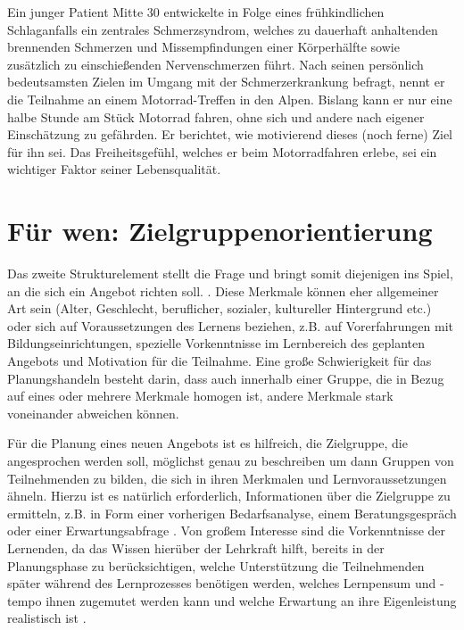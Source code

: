 \documentclass[
  twoside,
  parskip=half-,
]{scrreprt}
\begin{document}
\begin{beispiel}
  Ein junger Patient Mitte 30 entwickelte in Folge eines frühkindlichen Schlaganfalls ein zentrales Schmerzsyndrom, welches zu dauerhaft anhaltenden brennenden Schmerzen und Missempfindungen einer Körperhälfte sowie zusätzlich zu einschießenden Nervenschmerzen führt. Nach seinen persönlich bedeutsamsten Zielen im Umgang mit der Schmerzerkrankung befragt, nennt er die Teilnahme an einem Motorrad-Treffen in den Alpen. Bislang kann er nur eine halbe Stunde am Stück Motorrad fahren, ohne sich und andere nach eigener Einschätzung zu gefährden. Er berichtet, wie motivierend dieses (noch ferne) Ziel für ihn sei. Das Freiheitsgefühl, welches er beim Motorradfahren erlebe, sei ein wichtiger Faktor seiner Lebensqualität. 
\end{beispiel}


\section{Für wen: Zielgruppenorientierung}

Das zweite Strukturelement stellt die Frage  und bringt somit diejenigen ins Spiel, an die sich ein Angebot richten soll.
. Diese Merkmale können eher allgemeiner Art sein (Alter, Geschlecht, beruflicher, sozialer, kultureller Hintergrund etc.) oder sich auf Voraussetzungen des Lernens beziehen, z.B. auf Vorerfahrungen mit Bildungseinrichtungen, spezielle Vorkenntnisse im Lernbereich des geplanten Angebots und Motivation für die Teilnahme. Eine große Schwierigkeit für das Planungshandeln besteht darin, dass auch innerhalb einer Gruppe, die in Bezug auf eines oder mehrere Merkmale homogen ist, andere Merkmale stark voneinander abweichen können.

Für die Planung eines neuen Angebots ist es hilfreich, die Zielgruppe, die angesprochen werden soll, möglichst genau zu beschreiben um dann Gruppen von Teilnehmenden zu bilden, die sich in ihren Merkmalen und Lernvoraussetzungen ähneln. Hierzu ist es natürlich erforderlich, Informationen über die Zielgruppe zu ermitteln, z.B. in Form einer vorherigen Bedarfsanalyse, einem Beratungsgespräch oder einer Erwartungsabfrage \autocite[vgl.][19]{kos}. Von großem Interesse sind die Vorkenntnisse der Lernenden, da das Wissen hierüber der Lehrkraft hilft, bereits in der Planungsphase zu berücksichtigen, welche Unterstützung die Teilnehmenden später während des Lernprozesses benötigen werden, welches Lernpensum und -tempo ihnen zugemutet werden kann und welche Erwartung an ihre Eigenleistung realistisch ist \autocite[vgl.][19]{kos}. 
\end{document}
